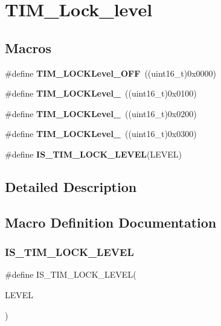 \section{T\+I\+M\+\_\+\+Lock\+\_\+level}
\label{group__TIM__Lock__level}
\subsection*{Macros}
\begin{DoxyCompactItemize}
\item 
\#define \textbf{ T\+I\+M\+\_\+\+L\+O\+C\+K\+Level\+\_\+\+O\+FF}~((uint16\+\_\+t)0x0000)
\item 
\#define \textbf{ T\+I\+M\+\_\+\+L\+O\+C\+K\+Level\+\_}~((uint16\+\_\+t)0x0100)
\item 
\#define \textbf{ T\+I\+M\+\_\+\+L\+O\+C\+K\+Level\+\_}~((uint16\+\_\+t)0x0200)
\item 
\#define \textbf{ T\+I\+M\+\_\+\+L\+O\+C\+K\+Level\+\_}~((uint16\+\_\+t)0x0300)
\item 
\#define \textbf{ I\+S\+\_\+\+T\+I\+M\+\_\+\+L\+O\+C\+K\+\_\+\+L\+E\+V\+EL}(L\+E\+V\+EL)
\end{DoxyCompactItemize}


\subsection{Detailed Description}


\subsection{Macro Definition Documentation}
\mbox{\label{group__TIM__Lock__level_gacf5e70717f6d13af301331bb043f5d48}} 
\subsubsection{I\+S\+\_\+\+T\+I\+M\+\_\+\+L\+O\+C\+K\+\_\+\+L\+E\+V\+EL}
{\footnotesize\ttfamily \#define I\+S\+\_\+\+T\+I\+M\+\_\+\+L\+O\+C\+K\+\_\+\+L\+E\+V\+EL(\begin{DoxyParamCaption}\item[{}]{L\+E\+V\+EL }\end{DoxyParamCaption})}

